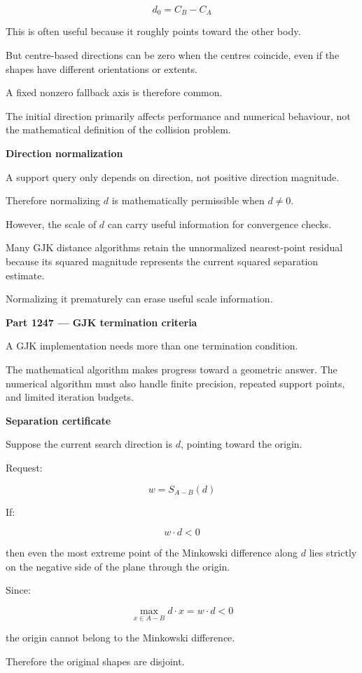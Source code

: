 \[
d_0=C_B-C_A
\]

This is often useful because it roughly points toward the other body.

But centre-based directions can be zero when the centres coincide, even if the shapes have different orientations or extents.

A fixed nonzero fallback axis is therefore common.

The initial direction primarily affects performance and numerical behaviour, not the mathematical definition of the collision problem.

\textbf{Direction normalization}

A support query only depends on direction, not positive direction magnitude.

Therefore normalizing \(d\) is mathematically permissible when \(d\ne0\).

However, the scale of \(d\) can carry useful information for convergence checks.

Many GJK distance algorithms retain the unnormalized nearest-point residual because its squared magnitude represents the current squared separation estimate.

Normalizing it prematurely can erase useful scale information.

\textbf{Part 1247 --- GJK termination criteria}

A GJK implementation needs more than one termination condition.

The mathematical algorithm makes progress toward a geometric answer. The numerical algorithm must also handle finite precision, repeated support points, and limited iteration budgets.

\textbf{Separation certificate}

Suppose the current search direction is \(d\), pointing toward the origin.

Request:

\[
w=S_{A-B}(d)
\]

If:

\[
\boxed{ w\cdot d<0 }
\]

then even the most extreme point of the Minkowski difference along \(d\) lies strictly on the negative side of the plane through the origin.

Since:

\[
\max_{x\in A-B}d\cdot x=w\cdot d<0
\]

the origin cannot belong to the Minkowski difference.

Therefore the original shapes are disjoint.

